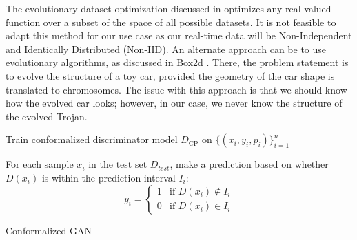 The evolutionary dataset optimization discussed in \cite{edo-paper} optimizes any real-valued function over a subset of the space of all possible datasets. It is not feasible to adapt this method for our use case as our real-time data will be Non-Independent and Identically Distributed (Non-IID). An alternate approach can be to use evolutionary algorithms, as discussed in Box2d \cite{catto2010box2d}. There, the problem statement is to evolve the structure of a toy car, provided the geometry of the car shape is translated to chromosomes. The issue with this approach is that we should know how the evolved car looks; however, in our case, we never know the structure of the evolved Trojan.

\begin{algorithm} [t]



Train conformalized discriminator model $D_\text{CP}$ on $\{(x_i, y_i, p_i)\}_{i=1}^n$\;

For each sample $x_i$ in the test set $D_{test}$, make a prediction based on whether $D(x_i)$ is within the prediction interval $I_i$:
\begin{equation*}
y_i =
\begin{cases}
1 & \text{if } D(x_i) \notin I_i \\
0 & \text{if } D(x_i) \in I_i
\end{cases}
\end{equation*}


\caption{Conformalized GAN}
\label{alg:cgan1}
\end{algorithm}

